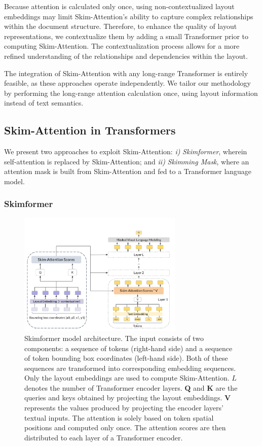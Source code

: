 Because attention is calculated only once, using non-contextualized layout embeddings may limit Skim-Attention's ability to capture complex relationships within the document structure. Therefore, to enhance the quality of layout representations, we contextualize them by adding a small Transformer prior to computing Skim-Attention. The contextualization process allows for a more refined understanding of the relationships and dependencies within the layout.

The integration of Skim-Attention with any long-range Transformer is entirely feasible, as these approaches operate independently. We tailor our methodology by performing the long-range attention calculation once, using layout information instead of text semantics.

\subsection{Skim-Attention in Transformers}

We present two approaches to exploit Skim-Attention:
\emph{i)} \textit{Skimformer}, wherein self-attention is replaced by Skim-Attention; and \emph{ii)} \textit{Skimming Mask}, where an attention mask is built from Skim-Attention and fed to a Transformer language model.

\subsubsection{Skimformer}

\begin{figure}[h]
    \centering
    \includegraphics[width=0.7\textwidth]{images/chapter3/skimformer-architecture.pdf}
    \caption{Skimformer model architecture. The input consists of two components: a sequence of tokens (right-hand side) and a sequence of token bounding box coordinates (left-hand side). Both of these sequences are transformed into corresponding embedding sequences. Only the layout embeddings are used to compute Skim-Attention. $L$ denotes the number of Transformer encoder layers. $\bm{Q}$ and $\bm{K}$ are the queries and keys obtained by projecting the layout embeddings. $\bm{V}$ represents the values produced by projecting the encoder layers' textual inputs. The attention is solely based on token spatial positions and computed only once. The attention scores are then distributed to each layer of a Transformer encoder.}
    \label{fig:skimformer-architecture}
\end{figure}

